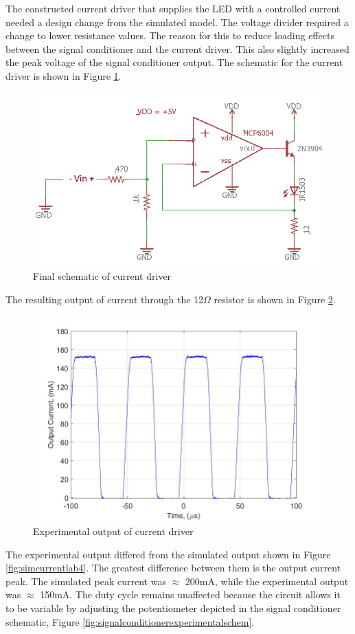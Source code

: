 
	
The constructed current driver that supplies the LED with a controlled current needed a design change from the simulated model. The voltage divider required a change to lower resistance values. The reason for this to reduce loading effects between the signal conditioner and the current driver. This also slightly increased the peak voltage of the signal conditioner output. The schematic for the current driver is shown in Figure \ref{fig:leddriverexperimentalschem}.
\begin{figure}[H]
	\centering
	\includegraphics[width=0.7\linewidth]{ExperimentalImplementation/LEDDriverExperimentalSchem}
	\caption{Final schematic of current driver}
	\label{fig:leddriverexperimentalschem}
\end{figure}

The resulting output of current through the 12$\Omega$ resistor is shown in Figure \ref{fig:expcurrentlab4}. 

\begin{figure}[H]
	\centering
	\includegraphics[width=0.7\linewidth]{ExperimentalImplementation/expcurrentlab4}
	\caption{Experimental output of current driver}
	\label{fig:expcurrentlab4}
\end{figure}

The experimental output differed from the simulated output shown in Figure \ref{fig:simcurrentlab4}. The greatest difference between them is the output current peak. The simulated peak current was $\approx$ 200mA, while the experimental output was $\approx$ 150mA. The duty cycle remains unaffected because the circuit allows it to be variable by adjusting the potentiometer depicted in the signal conditioner schematic, Figure \ref{fig:signalconditionerexperimentalschem}.   

